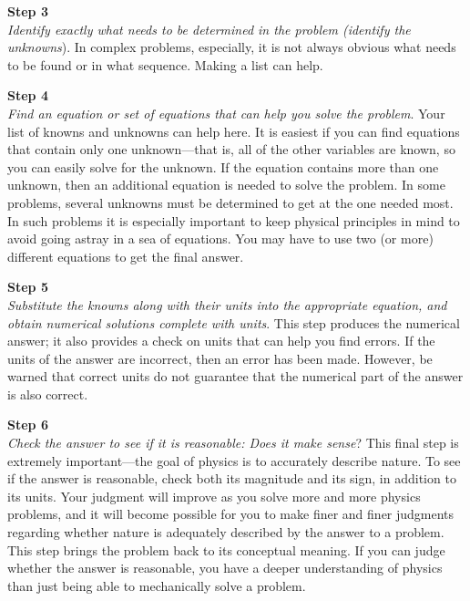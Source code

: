 \documentclass[dvipsnames]{article}
\begin{document}
\vspace{1em}

\textbf{Step 3}\\
\textit{Identify exactly what needs to be determined in the problem (identify the unknowns}). In complex problems, especially, it is not always obvious what needs to be found or in what sequence. Making a list can help.

\vspace{1em}

\textbf{Step 4}\\
\textit{Find an equation or set of equations that can help you solve the problem}. Your list of knowns and unknowns can help here. It is easiest if you can find equations that contain only one unknown---that is, all of the other variables are known, so you can easily solve for the unknown. If the equation contains more than one unknown, then an additional equation is needed to solve the problem. In some problems, several unknowns must be determined to get at the one needed most. In such problems it is especially important to keep physical principles in mind to avoid going astray in a sea of equations. You may have to use two (or more) different equations to get the final answer.

\vspace{1em}

\textbf{Step 5}\\
\textit{Substitute the knowns along with their units into the appropriate equation, and obtain numerical solutions complete with units}. This step produces the numerical answer; it also provides a check on units that can help you find errors. If the units of the answer are incorrect, then an error has been made. However, be warned that correct units do not guarantee that the numerical part of the answer is also correct.

\vspace{1em}

\textbf{Step 6}\\
\textit{Check the answer to see if it is reasonable: Does it make sense}? This final step is extremely important---the goal of physics is to accurately describe nature. To see if the answer is reasonable, check both its magnitude and its sign, in addition to its units. Your judgment will improve as you solve more and more physics problems, and it will become possible for you to make finer and finer judgments regarding whether nature is adequately described by the answer to a problem. This step brings the problem back to its conceptual meaning. If you can judge whether the answer is reasonable, you have a deeper understanding of physics than just being able to mechanically solve a problem.
\end{document}
